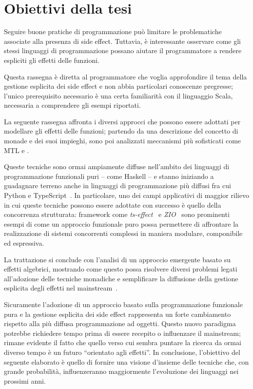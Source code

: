 \section*{Obiettivi della tesi}
Seguire buone pratiche di programmazione può limitare le problematiche associate alla presenza di side effect. Tuttavia, è interessante osservare come gli stessi linguaggi di programmazione possano aiutare il programmatore a rendere espliciti gli effetti delle funzioni.

Questa rassegna è diretta al programmatore che voglia approfondire il tema della gestione esplicita dei side effect e non abbia particolari conoscenze pregresse; l'unico prerequisito necessario è una certa familiarità con il linguaggio Scala, necessaria a comprendere gli esempi riportati.

La seguente rassegna affronta i diversi approcci che possono essere adottati per modellare gli effetti delle funzioni; partendo da una descrizione del concetto di monade e dei suoi impieghi, sono poi analizzati meccanismi più sofisticati come \ac{MTL} e .

Queste tecniche sono ormai ampiamente diffuse nell'ambito dei linguaggi di programmazione funzionali puri -- come Haskell -- e stanno iniziando a guadagnare terreno anche in linguaggi di programmazione più diffusi fra cui Python e TypeScript~\cite{cit:pyro,cit:ts-effect,cit:wasmfx}.
In particolare, uno dei campi applicativi di maggior rilievo in cui queste tecniche possono essere adottate con successo è quello della concorrenza strutturata: framework come \emph{ts-effect}~\cite{cit:ts-effect} e \emph{ZIO}~\cite{cit:zio} sono prominenti esempi di come un approccio funzionale puro possa permettere di affrontare la realizzazione di sistemi concorrenti complessi in maniera modulare, componibile ed espressiva.

La trattazione si conclude con l'analisi di un approccio emergente basato su effetti algebrici, mostrando come questo possa risolvere diversi problemi legati all'adozione delle tecniche monadiche e semplificare la diffusione della gestione esplicita degli effetti nel mainstream~\cite{cit:algebraic-effect-handlers-go-mainstream}.

Sicuramente l'adozione di un approccio basato sulla programmazione funzionale pura e la gestione esplicita dei side effect rappresenta un forte cambiamento rispetto alla più diffusa programmazione ad oggetti. Questo nuovo paradigma potrebbe richiedere tempo prima di essere recepito o influenzare il mainstream; rimane evidente il fatto che quello verso cui sembra puntare la ricerca da ormai diverso tempo è un futuro ``orientato agli effetti''. In conclusione, l'obiettivo del seguente elaborato è quello di fornire una visione d'insieme delle tecniche che, con grande probabilità, influenzeranno maggiormente l'evoluzione dei linguaggi nei prossimi anni.
